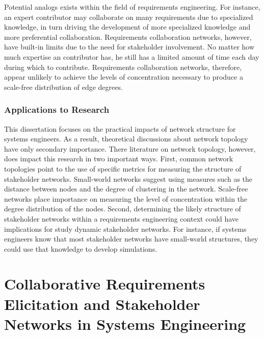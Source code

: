 Potential analogs exists within the field of requirements engineering. For instance, an expert contributor may collaborate on many requirements due to specialized knowledge, in turn driving the development of more specialized knowledge and more preferential collaboration. Requirements collaboration networks, however, have built-in limits due to the need for stakeholder involvement. No matter how much expertise an contributor has, he still has a limited amount of time each day during which to contribute. Requirements collaboration networks, therefore, appear unlikely to achieve the levels of concentration necessary to produce a scale-free distribution of edge degrees.

\subsubsection{Applications to Research}

This dissertation focuses on the practical impacts of network structure for systems engineers. As a result, theoretical discussions about network topology have only secondary importance. There literature on network topology, however, does impact this research in two important ways. First, common network topologies point to the use of specific metrics for measuring the structure of stakeholder networks. Small-world networks suggest using measures such as the distance between nodes and the degree of clustering in the network. Scale-free networks place importance on measuring the level of concentration within the degree distribution of the nodes. Second, determining the likely structure of stakeholder networks within a requirements engineering context could have implications for study dynamic stakeholder networks. For instance, if systems engineers know that most stakeholder networks have small-world structures, they could use that knowledge to develop simulations.

\section{Collaborative Requirements Elicitation and Stakeholder Networks in Systems Engineering}
\label{network_re}

